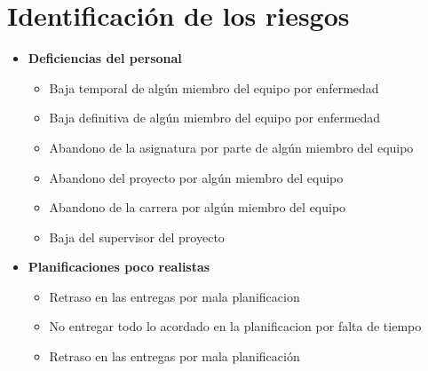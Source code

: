 \documentclass[spanish,a4paper,12pt]{report}	%
\begin{document}
\part{Identificación de los riesgos}
\begin{itemize}
\item \textbf {Deficiencias del personal}
	\begin{itemize}
		\item {Baja temporal de algún miembro del equipo por enfermedad}
		\item {Baja definitiva de algún miembro del equipo por enfermedad}
		\item {Abandono de la asignatura por parte de algún miembro del equipo}
		\item {Abandono del proyecto por algún miembro del equipo}
		\item {Abandono de la carrera por algún miembro del equipo}
		\item {Baja del supervisor del proyecto}
	\end{itemize}
\item \textbf {Planificaciones poco realistas}
	\begin{itemize}
		\item {Retraso en las entregas por mala planificacion}

		\item {No entregar todo lo acordado en la planificacion por falta de tiempo}
		\item {Retraso en las entregas por mala planificación}


\end{itemize}
\end{itemize}
\end{document}
